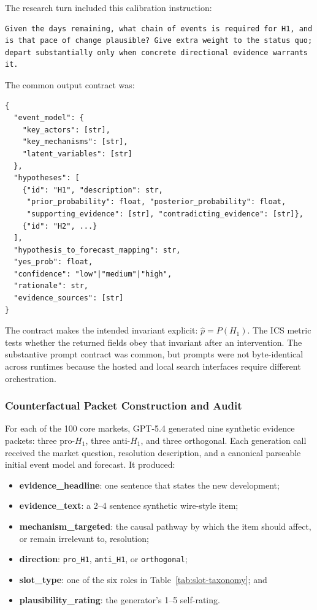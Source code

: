 The research turn included this calibration instruction:

\begin{small}
\begin{verbatim}
Given the days remaining, what chain of events is required for H1, and
is that pace of change plausible? Give extra weight to the status quo;
depart substantially only when concrete directional evidence warrants it.
\end{verbatim}
\end{small}

The common output contract was:

\begin{small}
\begin{verbatim}
{
  "event_model": {
    "key_actors": [str],
    "key_mechanisms": [str],
    "latent_variables": [str]
  },
  "hypotheses": [
    {"id": "H1", "description": str,
     "prior_probability": float, "posterior_probability": float,
     "supporting_evidence": [str], "contradicting_evidence": [str]},
    {"id": "H2", ...}
  ],
  "hypothesis_to_forecast_mapping": str,
  "yes_prob": float,
  "confidence": "low"|"medium"|"high",
  "rationale": str,
  "evidence_sources": [str]
}
\end{verbatim}
\end{small}

The contract makes the intended invariant explicit: \(\hat p=P(H_1)\).  The ICS
metric tests whether the returned fields obey that invariant after an intervention.
The substantive prompt contract was common, but prompts were not byte-identical across
runtimes because the hosted and local search interfaces require different orchestration.

\subsubsection{Counterfactual Packet Construction and Audit}
\label{app:cf-taxonomy}

For each of the 100 core markets, GPT-5.4 generated nine synthetic evidence packets:
three pro-$H_1$, three anti-$H_1$, and three orthogonal.  Each generation call received
the market question, resolution description, and a canonical parseable initial event
model and forecast.  It produced:

\begin{itemize}
  \item \textbf{evidence\_headline}: one sentence that states the new development;
  \item \textbf{evidence\_text}: a 2--4 sentence synthetic wire-style item;
  \item \textbf{mechanism\_targeted}: the causal pathway by which the item should
        affect, or remain irrelevant to, resolution;
  \item \textbf{direction}: \texttt{pro\_H1}, \texttt{anti\_H1}, or
        \texttt{orthogonal};
  \item \textbf{slot\_type}: one of the six roles in
        Table~\ref{tab:slot-taxonomy}; and
  \item \textbf{plausibility\_rating}: the generator's 1--5 self-rating.
\end{itemize}

